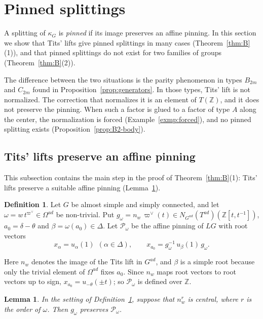 \documentclass[psamsfonts]{amsart}
\newtheorem{lem}[thm]{Lemma}
\theoremstyle{definition}
\newtheorem{defn}[thm]{Definition}
\theoremstyle{remark}
\numberwithin{equation}{section}
\newcommand{\Z}{\mathbb{Z}}   %
\newcommand\cP{\mathcal{P}}
\numberwithin{equation}{section}
\newcommand{\om}{\omega}
\newcommand{\Om}{\Omega}
\theoremstyle{plain}
\begin{document}
\section{Pinned splittings}\label{sec:pinned}

A splitting of $\kappa_G$ is \emph{pinned} if its image preserves an affine pinning. In this section we show that Tits' lifts give pinned splittings in many cases (Theorem~\ref{thm:B}(1)), and that pinned splittings do not exist for two families of groups (Theorem~\ref{thm:B}(2)).

The difference between the two situations is the parity phenomenon in types $B_{2m}$ and $C_{2m}$ found in Proposition~\ref{prop:generators}. In those types, Tits' lift is not normalized. The correction that normalizes it is an element of $T(\Z)$, and it does not preserve the pinning. When such a factor is glued to a factor of type $A$ along the center, the normalization is forced (Example~\ref{exmp:forced}), and no pinned splitting exists (Proposition~\ref{prop:B2-body}).

\subsection{Tits' lifts preserve an affine pinning}
This subsection contains the main step in the proof of Theorem~\ref{thm:B}(1): Tits' lifts preserve a suitable affine pinning (Lemma~\ref{lem:pinned-tits}).

\begin{defn}\label{defn:P-omega}
Let $G$ be almost simple and simply connected, and let $\om=w\,t^{\varpi^\vee}\in\Om^{ad}$ be non-trivial. Put $g_\om=n_w\,\varpi^\vee(t)\in N_{G^{ad}}(T^{ad})(\Z[t,t^{-1}])$, $a_0=\delta-\theta$ and $\beta=\om(a_0)\in\Delta$. Let $\cP_\om$ be the affine pinning of $LG$ with root vectors
\[
x_\alpha=u_\alpha(1)\ \ (\alpha\in\Delta),\qquad x_{a_0}=g_\om^{-1}\,u_\beta(1)\,g_\om.
\]
\end{defn}

Here $n_w$ denotes the image of the Tits lift in $G^{ad}$, and $\beta$ is a simple root because only the trivial element of $\Om^{ad}$ fixes $a_0$. Since $n_w$ maps root vectors to root vectors up to sign, $x_{a_0}=u_{-\theta}(\pm t)$; so $\cP_\om$ is defined over $\Z$.

\begin{lem}\label{lem:pinned-tits}
In the setting of Definition~\ref{defn:P-omega}, suppose that $n_w^r$ is central, where $r$ is the order of $\om$. Then $g_\om$ preserves $\cP_\om$.
\end{lem}
\end{document}
